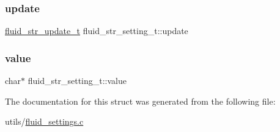 \mbox{\label{structfluid__str__setting__t_a55e8b96eeaaf9d6dd392fbe0b123c698}} 
\subsubsection{\texorpdfstring{update}{update}}
{\footnotesize\ttfamily \hyperlink{fluid__settings_8h_a7a2ee5199ed26bcf570403bdc08b0cbb}{fluid\+\_\+str\+\_\+update\+\_\+t} fluid\+\_\+str\+\_\+setting\+\_\+t\+::update}

\mbox{\label{structfluid__str__setting__t_a216a63997a2b5d7d189413eed6fb75e8}} 
\subsubsection{\texorpdfstring{value}{value}}
{\footnotesize\ttfamily char$\ast$ fluid\+\_\+str\+\_\+setting\+\_\+t\+::value}



The documentation for this struct was generated from the following file\+:\begin{DoxyCompactItemize}
\item 
utils/\hyperlink{fluid__settings_8c}{fluid\+\_\+settings.\+c}\end{DoxyCompactItemize}
